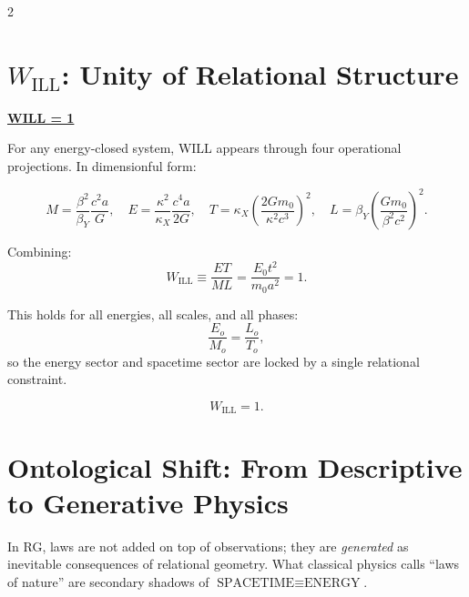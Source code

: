 \documentclass[10pt, a4paper]{article}
\begin{document}
\begin{multicols}{2}

\section{$W_{\text{ILL}}$: Unity of Relational Structure}
\hypertarget{sec:willinvariant}{}\label{sec:willinvariant}

\begin{tcolorbox}[colback=gray!5, colframe=black!80!black, title=Desmos project]
\textbf{\href{https://www.desmos.com/calculator/wswnhckrru}{WILL = 1}}
\end{tcolorbox}

For any energy-closed system, WILL appears through four operational projections. In dimensionful form:
\begin{small}
\[
M = \frac{\beta^{2}}{\beta_{Y}}\frac{c^{2}a}{G}, \quad
E = \frac{\kappa^{2}}{\kappa_{X}}\frac{c^{4}a}{2G}, \quad
T = \kappa_{X}\!\left(\frac{2Gm_{0}}{\kappa^{2}c^{3}}\right)^{\!2}\!, \quad
L = \beta_{Y}\!\left(\frac{Gm_{0}}{\beta^{2}c^{2}}\right)^{\!2}\!.
\]
\end{small}

Combining:
\[
\boxed{W_{\text{ILL}} \equiv \frac{ET}{ML} = \frac{E_0 t^2}{m_0 a^2} = 1.}
\]

This holds for all energies, all scales, and all phases:
\[
\frac{E_{o}}{M_{o}} = \frac{L_{o}}{T_{o}},
\]
so the energy sector and spacetime sector are locked by a single relational constraint.

\[
\boxed{W_{\text{ILL}}= 1.}
\]



\section{Ontological Shift: From Descriptive to Generative Physics}
\hypertarget{Generative Physics}{}\label{Generative Physics}

In RG, laws are not added on top of observations; they are \emph{generated} as inevitable consequences of relational geometry. What classical physics calls ``laws of nature'' are secondary shadows of $\text{SPACETIME} \equiv \text{ENERGY}$.


\end{multicols}
\end{document}
